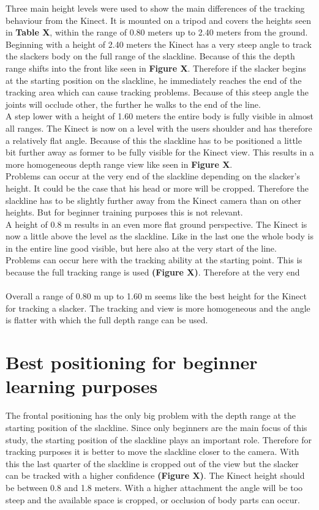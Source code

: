Three main height levels were used to show the main differences of the tracking behaviour from the Kinect. It is mounted on a tripod and covers the heights seen in \textbf{Table X}, within the range of 0.80 meters up to 2.40 meters from the ground.
\\
Beginning with a height of 2.40 meters the Kinect has a very steep angle to track the slackers body on the full range of the slackline. Because of this the depth range shifts into the front like seen in \textbf{Figure X}. Therefore if the slacker begins at the starting position on the slackline, he immediately reaches the end of the tracking area which can cause tracking problems. Because of this steep angle the joints will occlude other, the further he walks to the end of the line.
\\
A step lower with a height of 1.60 meters the entire body is fully visible in almost all ranges. The Kinect is now on a level with the users shoulder and has therefore a relatively flat angle. Because of this the slackline has to be positioned a little bit further away as former to be fully visible for the Kinect view. This results in a more homogeneous depth range view like seen in \textbf{Figure X}.
\\
Problems can occur at the very end of the slackline depending on the slacker’s height. It could be the case that his head or more will be cropped. Therefore the slackline has to be slightly further away from the Kinect camera than on other heights. But for beginner training purposes this is not relevant.
\\
A height of 0.8 m results in an even more flat ground perspective. The Kinect is now a little above the level as the slackline. Like in the last one the whole body is in the entire line good visible, but here also at the very start of the line. Problems can occur here with the tracking ability at the starting point. This is because the full tracking range is used \textbf{(Figure X)}. Therefore at the very end  
\\\\
Overall a range of 0.80 m up to 1.60 m seems like the best height for the Kinect for tracking a slacker. The tracking and view is more homogeneous and the angle is flatter with which the full depth range can be used.

\section{Best positioning for beginner learning purposes}
The frontal positioning has the only big problem with the depth range at the starting position of the slackline. Since only beginners are the main focus of this study, the starting position of the slackline plays an important role. Therefore for tracking purposes it is better to move the slackline closer to the camera. With this the last quarter of the slackline is cropped out of the view but the slacker can be tracked with a higher confidence \textbf{(Figure X)}. The Kinect height should be between 0.8 and 1.8 meters. With a higher attachment the angle will be too steep and the available space is cropped, or occlusion of body parts can occur.
